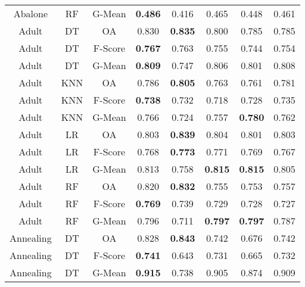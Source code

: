 \begin{longtable}{cccccccc}
        Abalone &         RF &  G-Mean & \textbf{0.486} &          0.416 &          0.465 &          0.448 &          0.461 \\
          Adult &         DT &      OA &          0.830 & \textbf{0.835} &          0.800 &          0.785 &          0.785 \\
          Adult &         DT & F-Score & \textbf{0.767} &          0.763 &          0.755 &          0.744 &          0.754 \\
          Adult &         DT &  G-Mean & \textbf{0.809} &          0.747 &          0.806 &          0.801 &          0.808 \\
          Adult &        KNN &      OA &          0.786 & \textbf{0.805} &          0.763 &          0.761 &          0.781 \\
          Adult &        KNN & F-Score & \textbf{0.738} &          0.732 &          0.718 &          0.728 &          0.735 \\
          Adult &        KNN &  G-Mean &          0.766 &          0.724 &          0.757 & \textbf{0.780} &          0.762 \\
          Adult &         LR &      OA &          0.803 & \textbf{0.839} &          0.804 &          0.801 &          0.803 \\
          Adult &         LR & F-Score &          0.768 & \textbf{0.773} &          0.771 &          0.769 &          0.767 \\
          Adult &         LR &  G-Mean &          0.813 &          0.758 & \textbf{0.815} & \textbf{0.815} &          0.805 \\
          Adult &         RF &      OA &          0.820 & \textbf{0.832} &          0.755 &          0.753 &          0.757 \\
          Adult &         RF & F-Score & \textbf{0.769} &          0.739 &          0.729 &          0.728 &          0.727 \\
          Adult &         RF &  G-Mean &          0.796 &          0.711 & \textbf{0.797} & \textbf{0.797} &          0.787 \\
      Annealing &         DT &      OA &          0.828 & \textbf{0.843} &          0.742 &          0.676 &          0.742 \\
      Annealing &         DT & F-Score & \textbf{0.741} &          0.643 &          0.731 &          0.665 &          0.732 \\
      Annealing &         DT &  G-Mean & \textbf{0.915} &          0.738 &          0.905 &          0.874 &          0.909 \\

\end{longtable}
